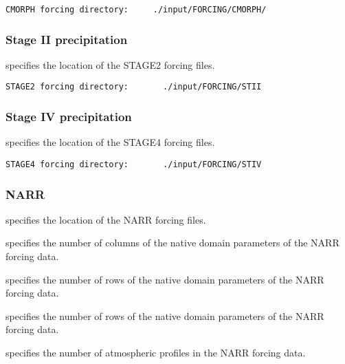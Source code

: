  \begin{Verbatim}[frame=single]
CMORPH forcing directory:     ./input/FORCING/CMORPH/
 \end{Verbatim}


 
 \subsubsection{Stage II precipitation} \label{sssec:supp_stageii}
 

 
  specifies the location of the
 STAGE2 forcing files.
 

 \begin{Verbatim}[frame=single]
STAGE2 forcing directory:       ./input/FORCING/STII
 \end{Verbatim}

 
 \subsubsection{Stage IV precipitation} \label{sssec:supp_stageiv}
 

 
  specifies the location of the
 STAGE4 forcing files.
 

 \begin{Verbatim}[frame=single]
STAGE4 forcing directory:       ./input/FORCING/STIV
 \end{Verbatim}



 
 \subsubsection{NARR} \label{sssec:supp_narr}
 

 
  specifies the location of the
 NARR forcing files.

  specifies the number of
 columns of the native domain parameters of the NARR forcing data.

  specifies the number of
 rows of the native domain parameters of the NARR forcing data.

  specifies the number of
 rows of the native domain parameters of the NARR forcing data.

  specifies the number of
 atmospheric profiles in the NARR forcing data.
 

